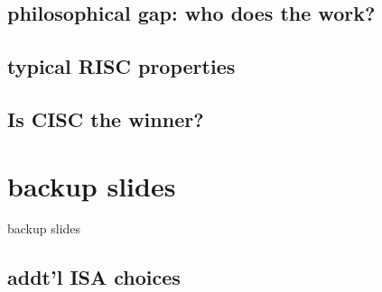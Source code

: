 


\subsection{philosophical gap: who does the work?}

\subsection{typical RISC properties}




\subsection{Is CISC the winner?}




\section{backup slides}
\begin{frame}{backup slides}
\end{frame}

\subsection{addt'l ISA choices}




